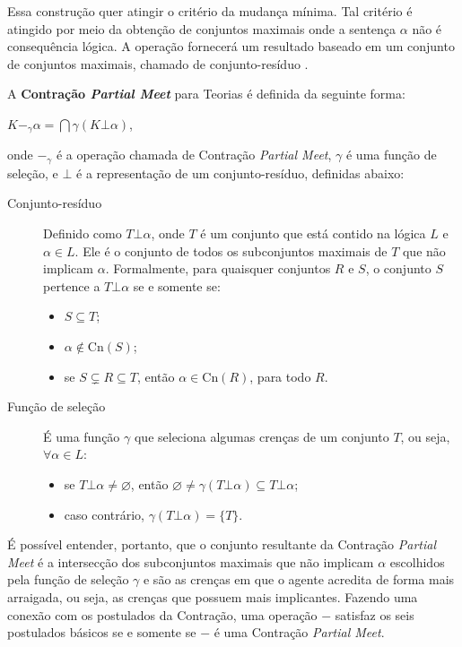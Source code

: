 Essa construção quer atingir o critério da mudança mínima. Tal critério é atingido por meio da obtenção de conjuntos maximais onde a sentença $ \alpha $ não é consequência lógica. A operação fornecerá um resultado baseado em um conjunto de conjuntos maximais, chamado de conjunto-resíduo \cite{revisaoCobe}.

A \textbf{Contração \textit{Partial Meet}} para Teorias é definida da seguinte forma: 

\begin{center}
	$ K -_{\gamma} \alpha = \bigcap \gamma(K \bot \alpha) $,
\end{center}

onde $ -_{\gamma} $ é a operação chamada de Contração \textit{Partial Meet}, $ \gamma $ é uma função de seleção, e $ \bot $ é a representação de um conjunto-resíduo, definidas abaixo:

\begin{description}
	\item[Conjunto-resíduo] Definido como $ T \bot \alpha $, onde $ T $ é um conjunto que está contido na lógica $ L $ e $ \alpha \in L $. Ele é o conjunto de todos os subconjuntos maximais de $ T $ que não implicam $ \alpha $. Formalmente, para quaisquer conjuntos $ R $ e $ S $, o conjunto $ S $ pertence a $ T \bot \alpha $ se e somente se:
	\begin{itemize}
		\item $ S \subseteq T $;
		\item $ \alpha \notin \text{Cn}(S) $;
		\item se $ S \subsetneq R \subseteq T $, então $ \alpha \in \text{Cn}(R)$, para todo $R$.
	\end{itemize}
	\item[Função de seleção] É uma função $ \gamma $ que seleciona algumas crenças de um conjunto $ T $, ou seja, $ \forall \alpha \in L $:
	\begin{itemize}
		\item se $ T \bot \alpha \neq \varnothing $, então $ \varnothing \neq \gamma(T \bot \alpha) \subseteq T \bot \alpha $;
		\item caso contrário, $ \gamma(T \bot \alpha) = \{T\} $.
	\end{itemize}
\end{description}

É possível entender, portanto, que o conjunto resultante da Contração \textit{Partial Meet} é a intersecção dos subconjuntos maximais que não implicam $ \alpha $ escolhidos pela função de seleção $ \gamma $ e são as crenças em que o agente acredita de forma mais arraigada, ou seja, as crenças que possuem mais implicantes. Fazendo uma conexão com os postulados da Con\-tra\-ção, uma operação $ - $ satisfaz os seis postulados básicos se e somente se $ - $ é uma Contração \textit{Partial Meet}.

